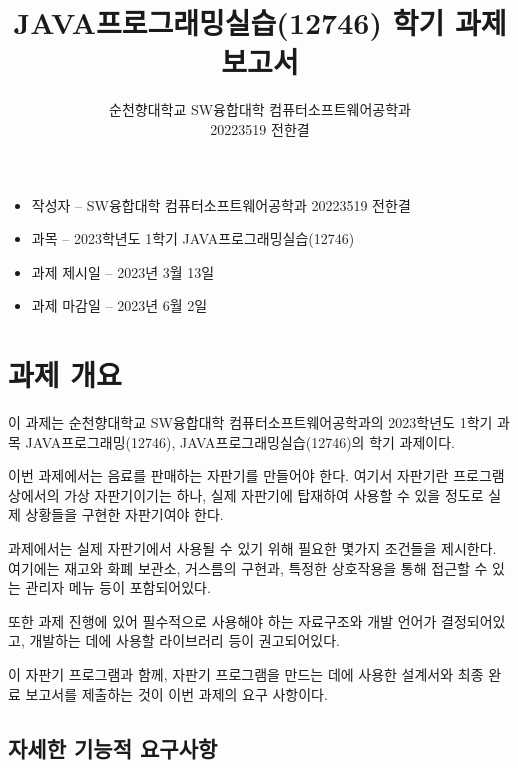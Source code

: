 \documentclass{oblivoir}
\title{JAVA프로그래밍실습(12746) 학기 과제 보고서}
\author{순천향대학교 SW융합대학 컴퓨터소프트웨어공학과\\20223519 전한결}
\begin{document}
    \maketitle

    \begin{itemize}
        \item 작성자 – SW융합대학 컴퓨터소프트웨어공학과 20223519 전한결
        \item 과목 – 2023학년도 1학기 JAVA프로그래밍실습(12746)
        \item 과제 제시일 – 2023년 3월 13일
        \item 과제 마감일 – 2023년 6월 2일
    \end{itemize}

    \pagebreak

    \tableofcontents

    \pagebreak

    \section{과제 개요}

    이 과제는 순천향대학교 SW융합대학 컴퓨터소프트웨어공학과의
    2023학년도 1학기 과목 JAVA프로그래밍(12746), JAVA프로그래밍실습(12746)의
    학기 과제이다.

    이번 과제에서는 음료를 판매하는 자판기를 만들어야 한다.
    여기서 자판기란 프로그램상에서의 가상 자판기이기는 하나,
    실제 자판기에 탑재하여 사용할 수 있을 정도로 실제 상황들을
    구현한 자판기여야 한다.

    과제에서는 실제 자판기에서 사용될 수 있기 위해 필요한 몇가지
    조건들을 제시한다.
    여기에는 재고와 화폐 보관소, 거스름의 구현과, 특정한 상호작용을 통해
    접근할 수 있는 관리자 메뉴 등이 포함되어있다.

    또한 과제 진행에 있어 필수적으로 사용해야 하는 자료구조와
    개발 언어가 결정되어있고,
    개발하는 데에 사용할 라이브러리 등이 권고되어있다.

    이 자판기 프로그램과 함께,
    자판기 프로그램을 만드는 데에 사용한 설계서와 최종 완료 보고서를
    제출하는 것이 이번 과제의 요구 사항이다.

    \subsection{자세한 기능적 요구사항}
\end{document}
